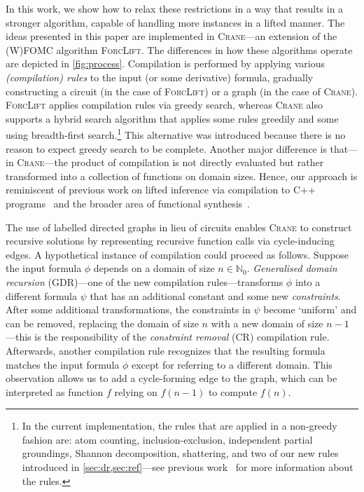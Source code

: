 \documentclass{article}
\theoremstyle{definition}
\theoremstyle{remark}
\begin{document}


In this work, we show how to relax these restrictions in a way that results in a
stronger algorithm, capable of handling more instances in a lifted manner. The
ideas presented in this paper are implemented in \textsc{Crane}---an extension
of the (W)FOMC algorithm \textsc{ForcLift}. The differences in how these
algorithms operate are depicted in \cref{fig:process}. Compilation is performed
by applying various \emph{(compilation) rules} to the input (or some derivative)
formula, gradually constructing a circuit (in the case of \textsc{ForcLift}) or
a graph (in the case of \textsc{Crane}). \textsc{ForcLift} applies compilation
rules via greedy search, whereas \textsc{Crane} also supports a hybrid search
algorithm that applies some rules greedily and some using breadth-first
search.\footnote{In the current implementation, the rules that are applied in a
  non-greedy fashion are: atom counting, inclusion-exclusion, independent
  partial groundings, Shannon decomposition, shattering, and two of our new
  rules introduced in \cref{sec:dr,sec:ref}---see previous
  work~\cite{DBLP:conf/ijcai/BroeckTMDR11} for more information about the
  rules.} This alternative was introduced because there is no reason to expect
greedy search to be complete. Another major difference is that---in
\textsc{Crane}---the product of compilation is not directly evaluated but rather
transformed into a collection of functions on domain sizes. Hence, our approach
is reminiscent of previous work on lifted inference via compilation to C++
programs~\cite{DBLP:conf/kr/KazemiP16} and the broader area of functional
synthesis~\cite{DBLP:conf/cav/GoliaRM20,DBLP:conf/pldi/KuncakMPS10,sanathanan1963transfer}.


The use of labelled directed graphs in lieu of circuits enables \textsc{Crane}
to construct recursive solutions by representing recursive function calls via
cycle-inducing edges. A hypothetical instance of compilation could proceed as
follows. Suppose the input formula $\phi$ depends on a domain of size
$n \in \mathbb{N}_{0}$. \emph{Generalised domain recursion} (GDR)---one of the
new compilation rules---transforms $\phi$ into a different formula $\psi$ that
has an additional constant and some new \emph{constraints}. After some
additional transformations, the constraints in $\psi$ become `uniform' and can
be removed, replacing the domain of size $n$ with a new domain of size
$n-1$---this is the responsibility of the \emph{constraint removal} (CR)
compilation rule. Afterwards, another compilation rule recognizes that the
resulting formula matches the input formula $\phi$ except for referring to a
different domain. This observation allows us to add a cycle-forming edge to the
graph, which can be interpreted as function $f$ relying on $f(n-1)$ to compute
$f(n)$.
\end{document}
